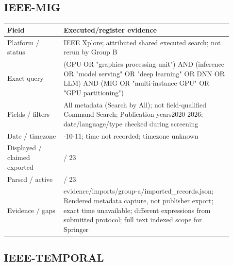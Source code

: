 \documentclass[12pt,a4paper]{article}
\begin{document}
\subsection*{IEEE-MIG}

{\small\begin{longtable}{>{\raggedright\arraybackslash}p{0.23\linewidth}>{\raggedright\arraybackslash}p{0.69\linewidth}}
\toprule
Field & Executed/\allowbreak{}register evidence\\\midrule
\endhead
Platform /\allowbreak{} status & IEEE Xplore; attributed shared executed search; not rerun by Group B\\
Exact query & (GPU OR "graphics processing unit") AND (inference OR "model serving" OR "deep learning" OR DNN OR LLM) AND (MIG OR "multi-instance GPU" OR "GPU partitioning")\\
Fields /\allowbreak{} filters & All metadata (Search by All); not field-qualified Command Search; Publication years2020-2026; date/\allowbreak{}language/\allowbreak{}type checked during screening\\
Date /\allowbreak{} timezone & 2026-10-11; time not recorded; timezone unknown\\
Displayed /\allowbreak{} claimed exported & 23 /\allowbreak{} 23\\
Parsed /\allowbreak{} active & 23 /\allowbreak{} 23\\
Evidence /\allowbreak{} gaps & evidence/\allowbreak{}imports/\allowbreak{}group-a/\allowbreak{}imported\_\allowbreak{}records.json; Rendered metadata capture, not publisher export; exact time unavailable; different expressions from submitted protocol; full text indexed scope for Springer\\
\bottomrule
\end{longtable}}

\subsection*{IEEE-TEMPORAL}
\end{document}
